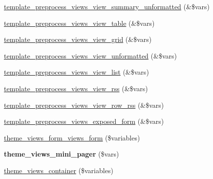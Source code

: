 \begin{DoxyCompactItemize}
\item 
\hyperlink{profiles_2dosomething_2modules_2contrib_2views_2theme_2theme_8inc_a62db89119e83936916ee3a538547ee94}{template\_\-preprocess\_\-views\_\-view\_\-summary\_\-unformatted} (\&\$vars)
\item 
\hyperlink{profiles_2dosomething_2modules_2contrib_2views_2theme_2theme_8inc_a0a837e138fb5af6ed94f0a920f9cce27}{template\_\-preprocess\_\-views\_\-view\_\-table} (\&\$vars)
\item 
\hyperlink{profiles_2dosomething_2modules_2contrib_2views_2theme_2theme_8inc_a4e72869a18e87d13a2247003b19a2126}{template\_\-preprocess\_\-views\_\-view\_\-grid} (\&\$vars)
\item 
\hyperlink{profiles_2dosomething_2modules_2contrib_2views_2theme_2theme_8inc_a98feb8e95b4f2a2cf7a901ae00cd8d97}{template\_\-preprocess\_\-views\_\-view\_\-unformatted} (\&\$vars)
\item 
\hyperlink{profiles_2dosomething_2modules_2contrib_2views_2theme_2theme_8inc_afa6e6b67428bc1104aaa46766f46f14c}{template\_\-preprocess\_\-views\_\-view\_\-list} (\&\$vars)
\item 
\hyperlink{profiles_2dosomething_2modules_2contrib_2views_2theme_2theme_8inc_abb7ecccf4a4116df254ce0d5b36af80f}{template\_\-preprocess\_\-views\_\-view\_\-rss} (\&\$vars)
\item 
\hyperlink{profiles_2dosomething_2modules_2contrib_2views_2theme_2theme_8inc_afdf403957b27d90455f81e19a5a4d611}{template\_\-preprocess\_\-views\_\-view\_\-row\_\-rss} (\&\$vars)
\item 
\hyperlink{profiles_2dosomething_2modules_2contrib_2views_2theme_2theme_8inc_a512315c0c9812618259dbc4f0f827efc}{template\_\-preprocess\_\-views\_\-exposed\_\-form} (\&\$vars)
\item 
\hyperlink{profiles_2dosomething_2modules_2contrib_2views_2theme_2theme_8inc_a29ca03c025eb650d6aa308f0152f5323}{theme\_\-views\_\-form\_\-views\_\-form} (\$variables)
\item 
\hypertarget{profiles_2dosomething_2modules_2contrib_2views_2theme_2theme_8inc_a3693cc8903ea7f30d937ebbedc001eef}{
{\bfseries theme\_\-views\_\-mini\_\-pager} (\$vars)}
\label{profiles_2dosomething_2modules_2contrib_2views_2theme_2theme_8inc_a3693cc8903ea7f30d937ebbedc001eef}

\item 
\hyperlink{profiles_2dosomething_2modules_2contrib_2views_2theme_2theme_8inc_ab7ef99fc936aacf3ebcbac40378f760f}{theme\_\-views\_\-container} (\$variables)
\end{DoxyCompactItemize}


